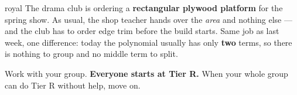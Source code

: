 \documentclass[10pt]{article}
\begin{document}

\vspace{0.15in}

\begin{scenariobox}{royal}
\small
The drama club is ordering a \textbf{rectangular plywood platform} for the spring show. As usual,
the shop teacher hands over the \emph{area} and nothing else --- and the club has to order edge trim
before the build starts. Same job as last week, one difference: today the polynomial usually has
only \textbf{two} terms, so there is nothing to group and no middle term to split.

Work with your group. \textbf{Everyone starts at Tier R.} When your whole group can do Tier R
without help, move on.
\end{scenariobox}

\vspace{0.10in}
\end{document}
